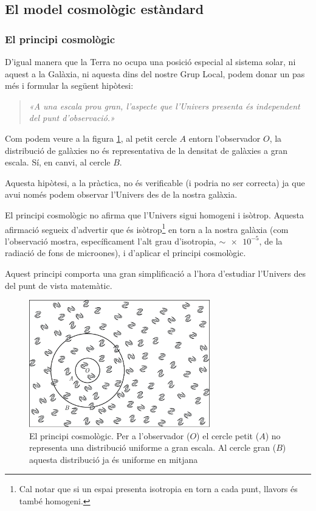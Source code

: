 \subsection{El model cosmològic estàndard}
\subsubsection*{El principi cosmològic}
D'igual manera que la Terra no ocupa una posició especial al sistema solar, ni aquest a la Galàxia, ni aquesta dins del nostre Grup Local, podem donar un pas més i formular la següent hipòtesi:
\begin{quote}
	\textit{«A una escala prou gran, l'aspecte que l'Univers presenta és independent del punt d'observació.»}
\end{quote}

Com podem veure a la figura \ref{fig:principi-cosmologic}, al petit cercle $A$ entorn l'observador $O$, la distribució de galàxies no és representativa de la densitat de galàxies a gran escala. Sí, en canvi, al cercle $B$.

Aquesta hipòtesi, a la pràctica, no és verificable (i podria no ser correcta) ja que avui només podem observar l'Univers des de la nostra galàxia.

El principi cosmològic no afirma que l'Univers sigui homogeni i isòtrop. Aquesta afirmació segueix d'advertir que és isòtrop\footnote{Cal notar que si un espai presenta isotropia en torn a cada punt, llavors és també homogeni.} en torn a la nostra galàxia (com l'observació mostra, específicament l'alt grau d'isotropia, $\sim \num{e-5}$, de la radiació de fons de microones), i d'aplicar el principi cosmològic.

Aquest principi comporta una gran simplificació a l'hora d'estudiar l'Univers des del punt de vista matemàtic.
\begin{figure}[h]
	\centering
	\includegraphics[width=0.7\textwidth]{./images/9-principi-cosmologic}
	\caption{El principi cosmològic. Per a l'observador ($O$) el cercle petit ($A$) no representa una distribució uniforme a gran escala. Al cercle gran ($B$) aquesta distribució ja és uniforme en mitjana}
	\label{fig:principi-cosmologic}
\end{figure}


